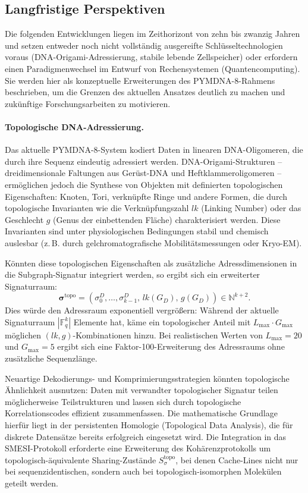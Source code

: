 ﻿\documentclass[a4paper,12pt]{article}
\theoremstyle{definition}
\begin{document}
\subsection{Langfristige Perspektiven}

Die folgenden Entwicklungen liegen im Zeithorizont von zehn bis zwanzig Jahren und setzen entweder noch nicht vollständig ausgereifte Schlüsseltechnologien voraus (DNA-Origami-Adressierung, stabile lebende Zellspeicher) oder erfordern einen Paradigmenwechsel im Entwurf von Rechensystemen (Quantencomputing). Sie werden hier als konzeptuelle Erweiterungen des PYMDNA-8-Rahmens beschrieben, um die Grenzen des aktuellen Ansatzes deutlich zu machen und zukünftige Forschungsarbeiten zu motivieren.

\paragraph{Topologische DNA-Adressierung.}
Das aktuelle PYMDNA-8-System kodiert Daten in linearen DNA-Oligomeren, die durch ihre Sequenz eindeutig adressiert werden. DNA-Origami-Strukturen -- dreidimensionale Faltungen aus Gerüst-DNA und Heftklammeroligomeren -- ermöglichen jedoch die Synthese von Objekten mit definierten topologischen Eigenschaften: Knoten, Tori, verknüpfte Ringe und andere Formen, die durch topologische Invarianten wie die Verknüpfungszahl $lk$ (Linking Number) oder das Geschlecht $g$ (Genus der einbettenden Fläche) charakterisiert werden. Diese Invarianten sind unter physiologischen Bedingungen stabil und chemisch auslesbar (z.\,B. durch gelchromatografische Mobilitätsmessungen oder Kryo-EM).

Könnten diese topologischen Eigenschaften als zusätzliche Adressdimensionen in die Subgraph-Signatur integriert werden, so ergibt sich ein erweiterter Signaturraum:
\begin{equation}
  \boldsymbol{\sigma}^{\mathrm{topo}} = (\sigma_0^D, \ldots, \sigma_{k-1}^D,
  \, lk(G_D), \, g(G_D)) \in \mathbb{N}^{k+2}.
\end{equation}
Dies würde den Adressraum exponentiell vergrößern: Während der aktuelle Signaturraum $|\mathbb{F}_q^k|$ Elemente hat, käme ein topologischer Anteil mit $L_{\max} \cdot G_{\max}$ möglichen $(lk, g)$-Kombinationen hinzu. Bei realistischen Werten von $L_{\max} = 20$ und $G_{\max} = 5$ ergibt sich eine Faktor-100-Erweiterung des Adressraums ohne zusätzliche Sequenzlänge.

Neuartige Dekodierungs- und Komprimierungsstrategien könnten topologische Ähnlichkeit ausnutzen: Daten mit verwandter topologischer Signatur teilen möglicherweise Teilstrukturen und lassen sich durch topologische Korrelationscodes effizient zusammenfassen. Die mathematische Grundlage hierfür liegt in der persistenten Homologie (Topological Data Analysis), die für diskrete Datensätze bereits erfolgreich eingesetzt wird. Die Integration in das SMESI-Protokoll erforderte eine Erweiterung des Kohärenzprotokolls um topologisch-äquivalente Sharing-Zustände $S_\sigma^{\mathrm{topo}}$, bei denen Cache-Lines nicht nur bei sequenzidentischen, sondern auch bei topologisch-isomorphen Molekülen geteilt werden.
\end{document}
